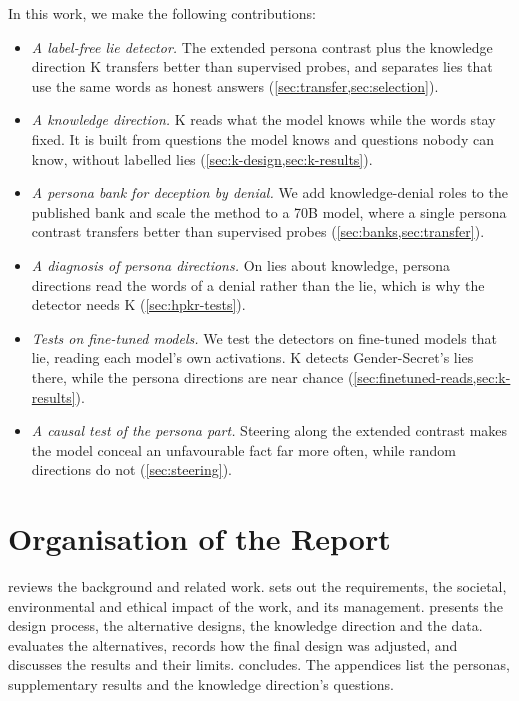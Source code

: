 In this work, we make the following contributions:
\begin{itemize}[leftmargin=1.2em, itemsep=2pt]
\item \emph{A label-free lie detector.} The extended persona contrast plus the knowledge direction K
  transfers better than supervised probes, and separates lies that use the same words as honest
  answers (\cref{sec:transfer,sec:selection}).
\item \emph{A knowledge direction.} K reads what the model knows while the words stay fixed. It is
  built from questions the model knows and questions nobody can know, without labelled lies
  (\cref{sec:k-design,sec:k-results}).
\item \emph{A persona bank for deception by denial.} We add knowledge-denial roles to the published
  bank and scale the method to a 70B model, where a single persona contrast transfers better than
  supervised probes (\cref{sec:banks,sec:transfer}).
\item \emph{A diagnosis of persona directions.} On lies about knowledge, persona directions read the
  words of a denial rather than the lie, which is why the detector needs K (\cref{sec:hpkr-tests}).
\item \emph{Tests on fine-tuned models.} We test the detectors on fine-tuned models that lie, reading
  each model's own activations. K detects Gender-Secret's lies there, while the persona directions
  are near chance (\cref{sec:finetuned-reads,sec:k-results}).
\item \emph{A causal test of the persona part.} Steering along the extended contrast makes the model
  conceal an unfavourable fact far more often, while random directions do not (\cref{sec:steering}).
\end{itemize}

\section{Organisation of the Report}

 reviews the background and related work.  sets out the requirements,
the societal, environmental and ethical impact of the work, and its management. 
presents the design process, the alternative designs, the knowledge direction and the data.
 evaluates the alternatives, records how the final design was adjusted, and
discusses the results and their limits.  concludes. The appendices list the
personas, supplementary results and the knowledge direction's questions.
